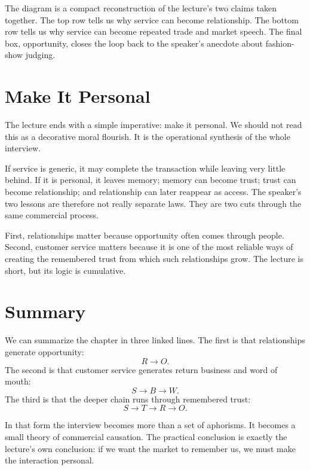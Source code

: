 The diagram is a compact reconstruction of the lecture's two claims taken together. The top row tells us why service can become relationship. The bottom row tells us why service can become repeated trade and market speech. The final box, opportunity, closes the loop back to the speaker's anecdote about fashion-show judging.

\section{Make It Personal}

The lecture ends with a simple imperative: make it personal. We should not read this as a decorative moral flourish. It is the operational synthesis of the whole interview.

If service is generic, it may complete the transaction while leaving very little behind. If it is personal, it leaves memory; memory can become trust; trust can become relationship; and relationship can later reappear as access. The speaker's two lessons are therefore not really separate laws. They are two cuts through the same commercial process.

First, relationships matter because opportunity often comes through people. Second, customer service matters because it is one of the most reliable ways of creating the remembered trust from which such relationships grow. The lecture is short, but its logic is cumulative.

\section{Summary}

We can summarize the chapter in three linked lines. The first is that relationships generate opportunity:
\[
R \to O.
\]
The second is that customer service generates return business and word of mouth:
\[
S \to B \to W.
\]
The third is that the deeper chain runs through remembered trust:
\[
S \to T \to R \to O.
\]

In that form the interview becomes more than a set of aphorisms. It becomes a small theory of commercial causation. The practical conclusion is exactly the lecture's own conclusion: if we want the market to remember us, we must make the interaction personal.